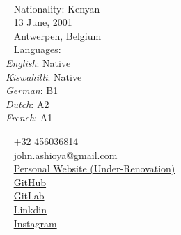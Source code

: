 \documentclass{modernsimplecv}
\begin{document}
\begin{minipage}[t]{0.77\textwidth}
\vspace{0pt} %
\begin{shaded*}

\begin{minipage}[t]{0.4\textwidth}
\vspace{0pt} %
{\par\centering\huge{}} \\[0.3cm]
\faGlobe~ Nationality: Kenyan\\
\faBirthdayCake~ 13 June, 2001 \\
\faMapMarker~ Antwerpen, Belgium\\

{\small
\faCommentsO~ \underline{Languages:} \\ 
\emph{English}: Native \\ 
\emph{Kiswahilli}: Native \\ 
\emph{German}: B1 \\ 
\emph{Dutch}: A2\\
\emph{French}: A1\\}
\end{minipage}\hfill
\begin{minipage}[t]{0.55\textwidth}
\vspace{0pt} %
\faPhone~ +32 456036814 \\
\faAt~ {john.ashioya@gmail.com} \\


\faFont~ \href{https://pashioya.com }{Personal Website (Under-Renovation)} \\
\faGithub~ \href{https://github.com/pashioya}{GitHub} \\
\faGitlab~ \href{https://gitlab.com/pashioya}{GitLab} \\
\faLinkedin~ \href{https://linkedin.com/in/paul-ashioya-1b1023153/}{Linkdin} \\
\faInstagram~ \href{https://instagram.com/paul.ashioya}{Instagram} \\


\end{minipage}
\hfill
\end{shaded*}
\end{minipage}\\[15pt]
\end{document}
